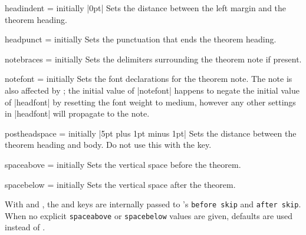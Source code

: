 \documentclass{ltxdoc}
\newcommand{\ttbraces}[1]{\braces{\texttt{#1}}}
\begin{document}
\begin{docKey}{headindent}
  {=}
  {initially |0pt|}
Sets the distance between the left margin and the theorem heading.
\end{docKey}

\begin{docKey}{headpunct}
  {=}
  {initially \ttbraces{.}}
Sets the punctuation that ends the theorem heading.
\end{docKey}

\begin{docKey}{notebraces}
  {=}
  {initially \ttbraces{(}\ttbraces{)}}
Sets the delimiters surrounding the theorem note if present.
\end{docKey}

\begin{docKey}{notefont}
  {=}
  {initially }
Sets the font declarations for the theorem note.
The note is also affected by ; the initial value of |notefont| happens to negate the initial value of |headfont| by resetting the font weight to medium, however any other settings in |headfont| will propagate to the note.
\end{docKey}

\begin{docKey}{postheadspace}
  {=}
  {initially |5pt plus 1pt minus 1pt|}
Sets the distance between the theorem heading and body.
Do not use this with the  key.
\end{docKey}

\begin{docKey}{spaceabove}
  {=}
  {initially }
Sets the vertical space before the theorem.
\end{docKey}

\begin{docKey}{spacebelow}
  {=}
  {initially }
Sets the vertical space after the theorem.
\end{docKey}

\begin{notebox}
With  and , the  and  keys are internally passed to 's \texttt{before skip} and \texttt{after skip}.
When no explicit \texttt{spaceabove} or \texttt{spacebelow} values are given,  defaults are used instead of .
\end{notebox}
\end{document}
